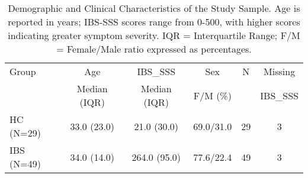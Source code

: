 \begin{table}[htb]
\centering
\begin{tabular}{lccccc}
\hline
Group & Age & IBS\_SSS & Sex & N & Missing \\
& Median (IQR) & Median (IQR) & F/M (\%) & & IBS\_SSS \\
\hline
HC (N=29) & 33.0 (23.0) & 21.0 (30.0) & 69.0/31.0 & 29 & 3 \\
IBS (N=49) & 34.0 (14.0) & 264.0 (95.0) & 77.6/22.4 & 49 & 3 \\
\hline
\end{tabular}
\caption{Demographic and Clinical Characteristics of the Study Sample. Age is reported in years; IBS-SSS scores range from 0-500, with higher scores indicating greater symptom severity. IQR = Interquartile Range; F/M = Female/Male ratio expressed as percentages.}
\label{table:demographics}
\end{table}
